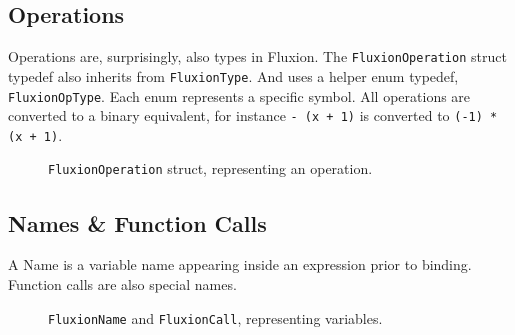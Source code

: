 \documentclass[11pt,a4paper]{article}
\newcommand{\code}[1]{\texttt{#1}}
\begin{document}
\subsection{Operations}

Operations are, surprisingly, also types in Fluxion. The \code{FluxionOperation} struct typedef also inherits from \code{FluxionType}. And uses a helper enum typedef, \code{FluxionOpType}. Each enum represents a specific symbol. All operations are converted to a binary equivalent, for instance \code{- (x + 1)} is converted to \code{(-1) * (x + 1)}.

\begin{figure}[httb]
\begin{center}
\end{center}
\caption{\code{FluxionOperation} struct, representing an operation.}
\end{figure}

\subsection{Names \& Function Calls}

A Name is a variable name appearing inside an expression prior to binding. Function calls are also special names.\\

\begin{figure}[httb]
\begin{center}
\end{center}
\caption{\code{FluxionName} and \code{FluxionCall}, representing variables.}
\end{figure}
\end{document}
